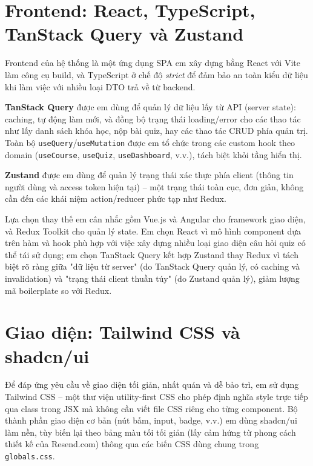 \documentclass[../DoAn.tex]{subfiles}
\begin{document}
\section{Frontend: React, TypeScript, TanStack Query và Zustand}
\label{section:3.4}

Frontend của hệ thống là một ứng dụng SPA em xây dựng bằng React \cite{reactdocs} với Vite làm công cụ build, và TypeScript ở chế độ \textit{strict} để đảm bảo an toàn kiểu dữ liệu khi làm việc với nhiều loại DTO trả về từ backend.

\textbf{TanStack Query} được em dùng để quản lý dữ liệu lấy từ API (server state): caching, tự động làm mới, và đồng bộ trạng thái loading/error cho các thao tác như lấy danh sách khóa học, nộp bài quiz, hay các thao tác CRUD phía quản trị. Toàn bộ \texttt{useQuery}/\texttt{useMutation} được em tổ chức trong các custom hook theo domain (\texttt{useCourse}, \texttt{useQuiz}, \texttt{useDashboard}, v.v.), tách biệt khỏi tầng hiển thị.

\textbf{Zustand} được em dùng để quản lý trạng thái xác thực phía client (thông tin người dùng và access token hiện tại) -- một trạng thái toàn cục, đơn giản, không cần đến các khái niệm action/reducer phức tạp như Redux.

Lựa chọn thay thế em cân nhắc gồm Vue.js và Angular cho framework giao diện, và Redux Toolkit cho quản lý state. Em chọn React vì mô hình component dựa trên hàm và hook phù hợp với việc xây dựng nhiều loại giao diện câu hỏi quiz có thể tái sử dụng; em chọn TanStack Query kết hợp Zustand thay Redux vì tách biệt rõ ràng giữa "dữ liệu từ server" (do TanStack Query quản lý, có caching và invalidation) và "trạng thái client thuần túy" (do Zustand quản lý), giảm lượng mã boilerplate so với Redux.

\section{Giao diện: Tailwind CSS và shadcn/ui}
\label{section:3.5}

Để đáp ứng yêu cầu về giao diện tối giản, nhất quán và dễ bảo trì, em sử dụng Tailwind CSS \cite{tailwindcss} -- một thư viện utility-first CSS cho phép định nghĩa style trực tiếp qua class trong JSX mà không cần viết file CSS riêng cho từng component. Bộ thành phần giao diện cơ bản (nút bấm, input, badge, v.v.) em dùng shadcn/ui làm nền, tùy biến lại theo bảng màu tối tối giản (lấy cảm hứng từ phong cách thiết kế của Resend.com) thông qua các biến CSS dùng chung trong \texttt{globals.css}.
\end{document}
